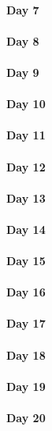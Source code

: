 \documentclass[UTF8,a4paper,8pt]{ctexart}
\begin{document}
 	 \paragraph{Day 7       \quad     }
 	 \paragraph{Day 8       \quad     }
 	 \paragraph{Day 9       \quad     }
 	 \paragraph{Day 10      \quad     }
 	 \paragraph{Day 11      \quad     }
 	 \paragraph{Day 12      \quad     }
 	 \paragraph{Day 13      \quad     }
 	 \paragraph{Day 14      \quad     }
 	 \paragraph{Day 15      \quad     }
 	 \paragraph{Day 16      \quad     }
 	 \paragraph{Day 17      \quad     }
 	 \paragraph{Day 18      \quad     }
 	 \paragraph{Day 19      \quad     }
 	 \paragraph{Day 20      \quad     }
\end{document}
